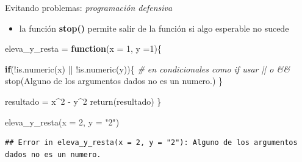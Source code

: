 \documentclass[
  ignorenonframetext,
]{beamer}
\newenvironment{Shaded}{\begin{snugshade}}{\end{snugshade}}
\newcommand{\AttributeTok}[1]{\textcolor[rgb]{0.77,0.63,0.00}{#1}}
\newcommand{\CommentTok}[1]{\textcolor[rgb]{0.56,0.35,0.01}{\textit{#1}}}
\newcommand{\ControlFlowTok}[1]{\textcolor[rgb]{0.13,0.29,0.53}{\textbf{#1}}}
\newcommand{\DecValTok}[1]{\textcolor[rgb]{0.00,0.00,0.81}{#1}}
\newcommand{\FunctionTok}[1]{\textcolor[rgb]{0.00,0.00,0.00}{#1}}
\newcommand{\NormalTok}[1]{#1}
\newcommand{\OtherTok}[1]{\textcolor[rgb]{0.56,0.35,0.01}{#1}}
\newcommand{\SpecialCharTok}[1]{\textcolor[rgb]{0.00,0.00,0.00}{#1}}
\newcommand{\StringTok}[1]{\textcolor[rgb]{0.31,0.60,0.02}{#1}}
\providecommand{\tightlist}{%
  \setlength{\itemsep}{0pt}\setlength{\parskip}{0pt}}
\begin{document}
\begin{frame}[fragile]{Evitando problemas: \emph{programación
defensiva}}
\protect\hypertarget{evitando-problemas-programaciuxf3n-defensiva}{}
\begin{itemize}
\tightlist
\item
  la función \textbf{stop()} permite salir de la función si algo
  esperable no sucede
\end{itemize}

\small

\begin{Shaded}
\begin{Highlighting}[]
\NormalTok{eleva\_y\_resta }\OtherTok{=} \ControlFlowTok{function}\NormalTok{(}\AttributeTok{x =} \DecValTok{1}\NormalTok{, }\AttributeTok{y =}\DecValTok{1}\NormalTok{)\{}

  \ControlFlowTok{if}\NormalTok{(}\SpecialCharTok{!}\FunctionTok{is.numeric}\NormalTok{(x) }\SpecialCharTok{||} \SpecialCharTok{!}\FunctionTok{is.numeric}\NormalTok{(y))\{ }\CommentTok{\# en condicionales como if usar \textquotesingle{}||\textquotesingle{} o \textquotesingle{}\&\&\textquotesingle{}}
    \FunctionTok{stop}\NormalTok{(}\StringTok{\textquotesingle{}Alguno de los argumentos dados no es un numero.\textquotesingle{}}\NormalTok{)}
\NormalTok{  \}}
  
\NormalTok{  resultado }\OtherTok{=}\NormalTok{ x}\SpecialCharTok{\^{}}\DecValTok{2} \SpecialCharTok{{-}}\NormalTok{ y}\SpecialCharTok{\^{}}\DecValTok{2}
  \FunctionTok{return}\NormalTok{(resultado)}
\NormalTok{\}}

\FunctionTok{eleva\_y\_resta}\NormalTok{(}\AttributeTok{x =} \DecValTok{2}\NormalTok{, }\AttributeTok{y =} \StringTok{"2"}\NormalTok{)}
\end{Highlighting}
\end{Shaded}

\begin{verbatim}
## Error in eleva_y_resta(x = 2, y = "2"): Alguno de los argumentos dados no es un numero.
\end{verbatim}

\normalsize
\end{frame}
\end{document}
